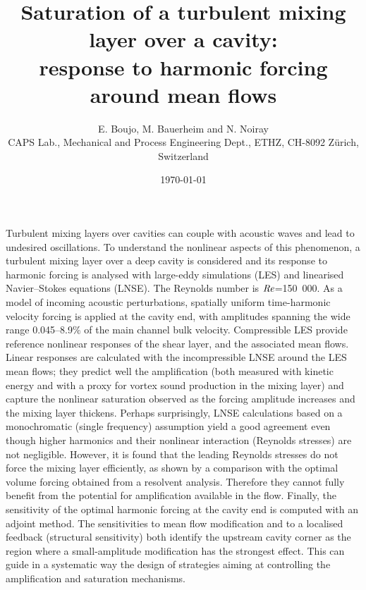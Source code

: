 \documentclass[11pt,onecolumn]{article}
\newcommand\Rey{\mbox{\textit{Re}}}
\begin{document}
\title{
Saturation of a turbulent mixing layer over a cavity:\\
response to harmonic forcing around mean flows
}

\author{
E. Boujo, M. Bauerheim and N. Noiray 
\\
\small CAPS Lab., Mechanical and Process Engineering Dept., ETHZ, CH-8092 Z\"urich, Switzerland
}

\date{\today}

\maketitle

\graphicspath{{./}}


\noindent 
Turbulent mixing layers over cavities can couple with acoustic waves and lead to undesired oscillations. To understand the nonlinear aspects of this phenomenon, a turbulent mixing layer over a deep cavity is considered and its response to harmonic forcing is analysed with large-eddy simulations (LES) and linearised Navier--Stokes equations (LNSE). The Reynolds number is $\Rey$=150~000. As a model of incoming acoustic perturbations, spatially uniform time-harmonic velocity forcing is applied at the cavity end, with amplitudes spanning the wide range 0.045--8.9$\%$ of the main channel bulk velocity. Compressible LES provide reference nonlinear responses of the shear layer, and the associated mean flows. Linear responses are calculated with the incompressible LNSE around the LES mean flows; they predict well the amplification (both measured with kinetic energy and with a proxy for vortex sound production in the mixing layer) and capture the nonlinear saturation observed as the forcing amplitude increases and the mixing layer thickens. Perhaps surprisingly, LNSE calculations  based on a monochromatic (single frequency) assumption yield a good agreement even though higher harmonics and their nonlinear interaction (Reynolds stresses) are not negligible. However, it is found that the leading Reynolds stresses do not force the mixing layer efficiently, as shown by a comparison with the optimal volume forcing obtained from a resolvent analysis. Therefore they cannot fully benefit from the potential for amplification available in the flow. Finally, the sensitivity of the optimal harmonic forcing at the cavity end is computed with an adjoint method. The sensitivities to mean flow modification and  to a localised feedback (structural sensitivity) both identify the upstream cavity corner as the region where a small-amplitude modification has the strongest effect. This can guide in a systematic way the design of strategies aiming at controlling the amplification and saturation mechanisms.
\end{document}

